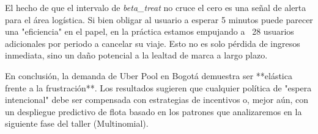 \documentclass[11pt,a4paper]{article}
\begin{document}
El hecho de que el intervalo de \textit{beta\_treat} no cruce el cero es una señal de alerta para el área logística. Si bien obligar al usuario a esperar 5 minutos puede parecer una "eficiencia" en el papel, en la práctica estamos empujando a ~28 usuarios adicionales por periodo a cancelar su viaje. Esto no es solo pérdida de ingresos inmediata, sino un daño potencial a la lealtad de marca a largo plazo. 

En conclusión, la demanda de Uber Pool en Bogotá demuestra ser **elástica frente a la frustración**. Los resultados sugieren que cualquier política de "espera intencional" debe ser compensada con estrategias de incentivos o, mejor aún, con un despliegue predictivo de flota basado en los patrones que analizaremos en la siguiente fase del taller (Multinomial).
\end{document}
